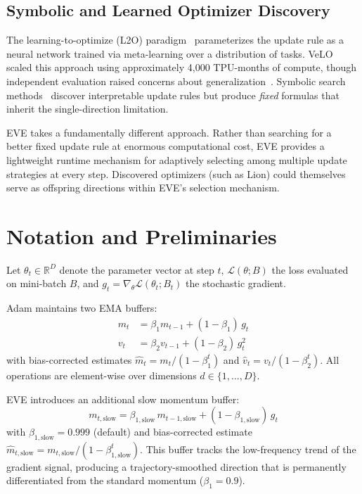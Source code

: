 \documentclass[12pt]{article}
\newcommand{\R}{\mathbb{R}}
\newcommand{\Loss}{\mathcal{L}}
\begin{document}
\subsection{Symbolic and Learned Optimizer Discovery}

The learning-to-optimize (L2O) paradigm~\cite{andrychowicz2016l2l}
parameterizes the update rule as a neural network trained via
meta-learning over a distribution of tasks.
VeLO~\cite{metz2022velo} scaled this approach using approximately
4,000 TPU-months of compute, though independent evaluation raised
concerns about generalization~\cite{kaddour2023velo}.
Symbolic search methods~\cite{bello2017neural, chen2024lion} discover
interpretable update rules but produce \emph{fixed} formulas that
inherit the single-direction limitation.

EVE takes a fundamentally different approach.
Rather than searching for a better fixed update rule at enormous
computational cost, EVE provides a lightweight runtime mechanism
for adaptively selecting among multiple update strategies at every
step.
Discovered optimizers (such as Lion) could themselves serve as
offspring directions within EVE's selection mechanism.


\section{Notation and Preliminaries}
\label{sec:notation}

Let $\theta_t \in \R^D$ denote the parameter vector at step $t$,
$\Loss(\theta; B)$ the loss evaluated on mini-batch $B$, and
$g_t = \nabla_\theta \Loss(\theta_t; B_t)$ the stochastic gradient.

Adam maintains two EMA buffers:
\begin{align}
  m_t &= \beta_1 m_{t-1} + (1 - \beta_1)\, g_t
  \label{eq:adam_m} \\
  v_t &= \beta_2 v_{t-1} + (1 - \beta_2)\, g_t^2
  \label{eq:adam_v}
\end{align}
with bias-corrected estimates
$\hat{m}_t = m_t / (1 - \beta_1^t)$ and
$\hat{v}_t = v_t / (1 - \beta_2^t)$.
All operations are element-wise over dimensions $d \in \{1, \ldots, D\}$.

EVE introduces an additional slow momentum buffer:
\begin{equation}
  m_{t,\mathrm{slow}} = \beta_{1,\mathrm{slow}}\, m_{t-1,\mathrm{slow}}
    + (1 - \beta_{1,\mathrm{slow}})\, g_t
  \label{eq:m_slow}
\end{equation}
with $\beta_{1,\mathrm{slow}} = 0.999$ (default) and bias-corrected
estimate $\hat{m}_{t,\mathrm{slow}} = m_{t,\mathrm{slow}} /
(1 - \beta_{1,\mathrm{slow}}^t)$.
This buffer tracks the low-frequency trend of the gradient signal,
producing a trajectory-smoothed direction that is permanently
differentiated from the standard momentum ($\beta_1 = 0.9$).
\end{document}
